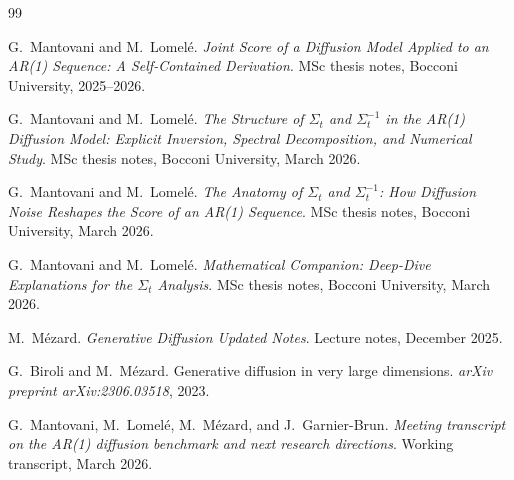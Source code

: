 \begin{thebibliography}{99}

G.~Mantovani and M.~Lomel\'e.
\newblock \emph{Joint Score of a Diffusion Model Applied to an AR(1) Sequence: A Self-Contained Derivation}.
\newblock MSc thesis notes, Bocconi University, 2025--2026.

G.~Mantovani and M.~Lomel\'e.
\newblock \emph{The Structure of $\Sigma_t$ and $\Sigma_t^{-1}$ in the AR(1) Diffusion Model: Explicit Inversion, Spectral Decomposition, and Numerical Study}.
\newblock MSc thesis notes, Bocconi University, March 2026.

G.~Mantovani and M.~Lomel\'e.
\newblock \emph{The Anatomy of $\Sigma_t$ and $\Sigma_t^{-1}$: How Diffusion Noise Reshapes the Score of an AR(1) Sequence}.
\newblock MSc thesis notes, Bocconi University, March 2026.

G.~Mantovani and M.~Lomel\'e.
\newblock \emph{Mathematical Companion: Deep-Dive Explanations for the $\Sigma_t$ Analysis}.
\newblock MSc thesis notes, Bocconi University, March 2026.

M.~M\'ezard.
\newblock \emph{Generative Diffusion Updated Notes}.
\newblock Lecture notes, December 2025.

G.~Biroli and M.~M\'ezard.
\newblock Generative diffusion in very large dimensions.
\newblock \emph{arXiv preprint arXiv:2306.03518}, 2023.

G.~Mantovani, M.~Lomel\'e, M.~M\'ezard, and J.~Garnier-Brun.
\newblock \emph{Meeting transcript on the AR(1) diffusion benchmark and next research directions}.
\newblock Working transcript, March 2026.

\end{thebibliography}
